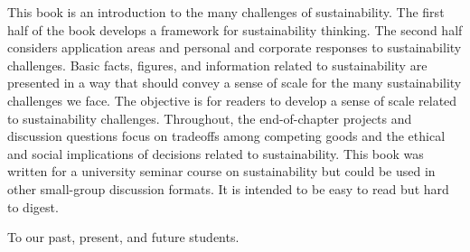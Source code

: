 \ABSTRACT
\noindent
This book is an introduction to the many challenges of sustainability.
The first half of the book develops a framework for sustainability thinking.
The second half considers application areas and personal and corporate responses
to sustainability challenges.
Basic facts, figures, and information related to sustainability are presented
in a way that should convey a sense of scale for the many sustainability challenges
we face.
The objective is for readers to develop a sense of scale related to sustainability challenges.
Throughout, the end-of-chapter projects and discussion questions focus on tradeoffs among 
competing goods and the ethical and social implications of decisions related to
sustainability.
This book was written for a university seminar course on sustainability but could
be used in other small-group discussion formats. 
It is intended to be easy to read but hard to digest.


\vfill

\cleardoublepage




{
\clearpage
\thispagestyle{plain}

\vspace*{13pc}\Large\it
\centerline{To our past, present, and future students.}
}

\cleardoublepage
 



{
\pagestyle{plain}
\tableofcontents
}

\cleardoublepage
 
 
 
 

